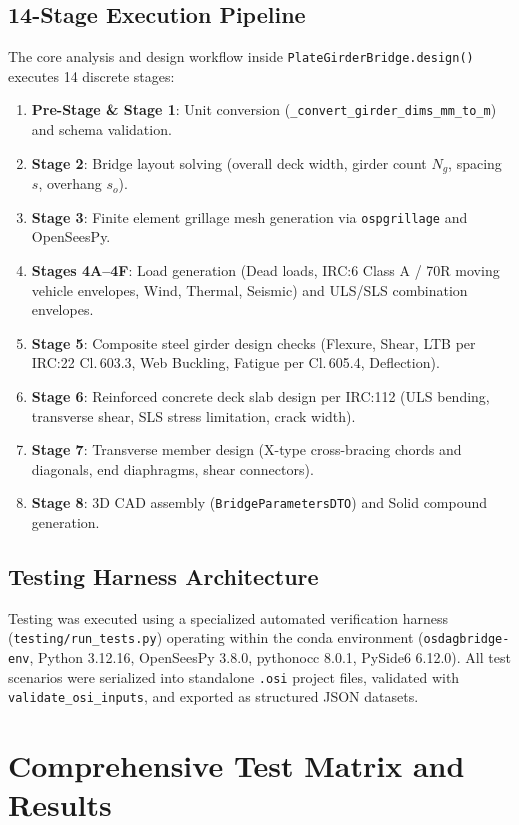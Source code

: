 \documentclass[11pt,a4paper]{article}
\begin{document}
\subsection{14-Stage Execution Pipeline}
The core analysis and design workflow inside \texttt{PlateGirderBridge.design()} executes 14 discrete stages:
\begin{enumerate}
    \item \textbf{Pre-Stage \& Stage 1}: Unit conversion (\texttt{\_convert\_girder\_dims\_mm\_to\_m}) and schema validation.
    \item \textbf{Stage 2}: Bridge layout solving (overall deck width, girder count $N_g$, spacing $s$, overhang $s_o$).
    \item \textbf{Stage 3}: Finite element grillage mesh generation via \texttt{ospgrillage} and OpenSeesPy.
    \item \textbf{Stages 4A--4F}: Load generation (Dead loads, IRC:6 Class A / 70R moving vehicle envelopes, Wind, Thermal, Seismic) and ULS/SLS combination envelopes.
    \item \textbf{Stage 5}: Composite steel girder design checks (Flexure, Shear, LTB per IRC:22 Cl.\,603.3, Web Buckling, Fatigue per Cl.\,605.4, Deflection).
    \item \textbf{Stage 6}: Reinforced concrete deck slab design per IRC:112 (ULS bending, transverse shear, SLS stress limitation, crack width).
    \item \textbf{Stage 7}: Transverse member design (X-type cross-bracing chords and diagonals, end diaphragms, shear connectors).
    \item \textbf{Stage 8}: 3D CAD assembly (\texttt{BridgeParametersDTO}) and Solid compound generation.
\end{enumerate}

\subsection{Testing Harness Architecture}
Testing was executed using a specialized automated verification harness (\texttt{testing/run\_tests.py}) operating within the conda environment (\texttt{osdagbridge-env}, Python 3.12.16, OpenSeesPy 3.8.0, pythonocc 8.0.1, PySide6 6.12.0). All test scenarios were serialized into standalone \texttt{.osi} project files, validated with \texttt{validate\_osi\_inputs}, and exported as structured JSON datasets.

\section{Comprehensive Test Matrix and Results}
\end{document}
